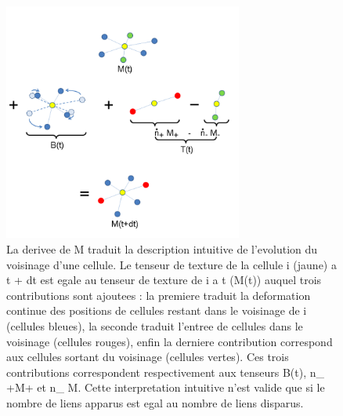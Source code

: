 \begin{figure}
\begin{center}
\includegraphics[width=0.7\textwidth]{../../images/Reconstruction/these_lombardot/p98_texture_tensor_derivative.png}
\end{center}
\caption{La derivee de M traduit la description intuitive de l'evolution du voisinage d'une cellule. Le tenseur de texture de la cellule i (jaune) a t + dt est egale au tenseur de texture de i a t (M(t)) auquel trois contributions sont ajoutees : la premiere traduit la deformation continue des positions de cellules restant dans le voisinage de i (cellules bleues), la seconde traduit l'entree de cellules dans le voisinage (cellules rouges), enfin la derniere contribution correspond aux cellules sortant du voisinage (cellules vertes). Ces trois contributions correspondent respectivement aux tenseurs B(t), n_ +M+ et n_ M. Cette interpretation intuitive n'est valide que si le nombre de liens apparus est egal au nombre de liens disparus.}
\label{these_lombardot_p98_texture_tensor_derivative}
\end{figure}

